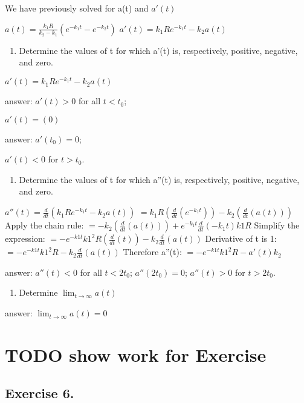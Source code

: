 \documentclass[]{article}
\providecommand{\tightlist}{%
  \setlength{\itemsep}{0pt}\setlength{\parskip}{0pt}}
\begin{document}
We have previously solved for a(t) and \(a'(t)\)

\(a(t) = \frac{k_1 R}{k_2-k_1}(e^{-k_1t} - e^{-k_2t})\)
\(a'(t) = k_1Re^{-k_1t}-k_2a(t)\)

\begin{enumerate}
\def\labelenumi{(\alph{enumi})}
\tightlist
\item
  Determine the values of t for which a'(t) is, respectively, positive,
  negative, and zero.
\end{enumerate}

\(a'(t) =k_1Re^{-k_1t}-k_2a(t)\)

answer: \(a'(t) > 0\) for all \(t < t_0\);

\(a'(t) = (0)\)

answer: \(a'(t_0) = 0\);

\(a'(t) < 0\) for \(t > t_0\).

\begin{enumerate}
\def\labelenumi{(\alph{enumi})}
\setcounter{enumi}{1}
\tightlist
\item
  Determine the values of t for which a''(t) is, respectively, positive,
  negative, and zero.
\end{enumerate}

\(a''(t) = \frac{d}{dt}(k_1Re^{-k_1t}-k_2a(t))\)
\(=k_1 R(\frac{d}{dt}(e^{-k_1 t}))- k_2 (\frac{d}{dt}(a(t)))\) Apply the
chain rule:
\(=- k_2 (\frac{d}{dt}(a(t)))+ e^{-k_1 t}\frac{d}{dt}({-k_1 t})k1 R\)
Simplify the expression:
\(=-e^{-k1 t}k1^2 R(\frac{d}{dt}(t)) -k_2 \frac{d}{dt}({a(t)})\)
Derivative of t is 1: \(=-e^{-k1 t}k1^2 R-k_2 \frac{d}{dt}({a(t)})\)
Therefore a''(t): \(=-e^{-k1 t}k1^2 R-a'(t)k_2\)

answer: \(a''(t) < 0\) for all \(t < 2t_0\); \(a''(2t_0) =0\);
\(a''(t) > 0\) for \(t > 2t_0\).

\begin{enumerate}
\def\labelenumi{(\alph{enumi})}
\setcounter{enumi}{2}
\tightlist
\item
  Determine \(\lim_{t\to\infty}a(t)\)
\end{enumerate}

answer: \(\lim_{t\to\infty}a(t) =0\)

\section{TODO show work for Exercise}\label{todo-show-work-for-exercise}

\subsection{Exercise 6.}\label{exercise-6.}
\end{document}
